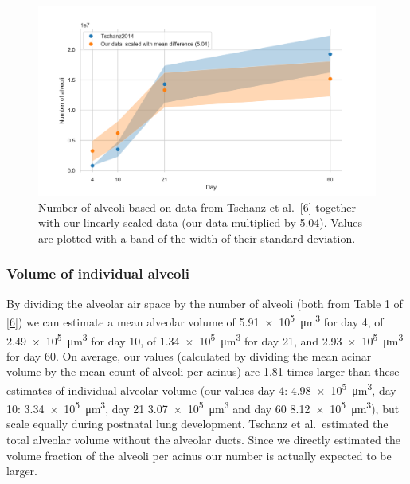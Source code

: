\documentclass[
  american,
]{article}
\begin{document}
\begin{figure}
\hypertarget{fig:08}{%
\centering
\includegraphics{images/fig08.png}
\caption{Number of alveoli based on data from Tschanz et al.~{[}\protect\hyperlink{ref-wnl86DEM}{6}{]} together with our linearly scaled data (our data multiplied by 5.04).
Values are plotted with a band of the width of their standard deviation.}\label{fig:08}
}
\end{figure}

\hypertarget{volume-of-individual-alveoli-1}{%
\subsubsection{Volume of individual alveoli}\label{volume-of-individual-alveoli-1}}

By dividing the alveolar air space by the number of alveoli (both from Table 1 of {[}\protect\hyperlink{ref-wnl86DEM}{6}{]}) we can estimate a mean alveolar volume of 5.91~×~10\textsuperscript{5}~μm\textsuperscript{3} for day 4, of 2.49~×~10\textsuperscript{5}~μm\textsuperscript{3} for day 10, of 1.34~×~10\textsuperscript{5}~μm\textsuperscript{3} for day 21, and 2.93~×~10\textsuperscript{5}~μm\textsuperscript{3} for day 60.
On average, our values (calculated by dividing the mean acinar volume by the mean count of alveoli per acinus) are 1.81 times larger than these estimates of individual alveolar volume (our values day 4: 4.98~×~10\textsuperscript{5}~μm\textsuperscript{3}, day 10: 3.34~×~10\textsuperscript{5}~μm\textsuperscript{3}, day 21 3.07~×~10\textsuperscript{5}~μm\textsuperscript{3} and day 60 8.12~×~10\textsuperscript{5}~μm\textsuperscript{3}), but scale equally during postnatal lung development.
Tschanz et al.~estimated the total alveolar volume without the alveolar ducts.
Since we directly estimated the volume fraction of the alveoli per acinus our number is actually expected to be larger.
\end{document}
